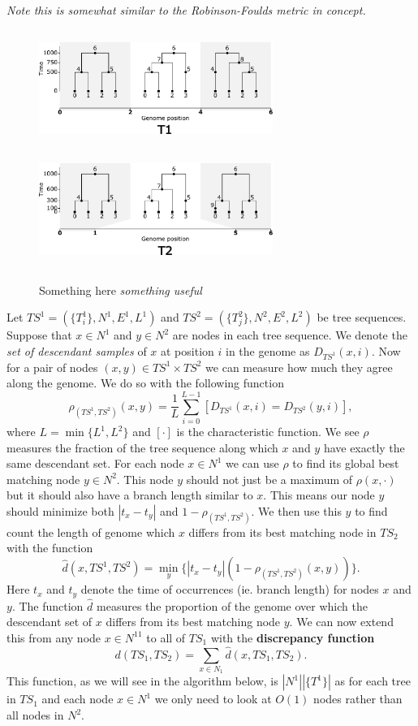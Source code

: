 \documentclass[10pt,twoside,lineno]{gsajnl}
\newcommand{\comment}[1]{{\color{blue} \it #1}}
\begin{document}
\comment{Note this is somewhat similar to the Robinson-Foulds metric in concept.}
 

\begin{figure}[!ht]
	\begin{center}
\includegraphics[height=1.5in, width=3in]{discrepancy_func_method_t1.pdf}
\includegraphics[height=1.5in, width=3in]{discrepancy_function_method_t2.pdf}
    \caption{
        Something here \comment{something useful}
        \label{fig:conceptual_discrepancy}
    }
	\end{center}
\end{figure}

 Let $TS^1=(\{T_i^1\},N^1,E^1,L^1)$ and $TS^2=(\{T^2_j\},N^2,E^2,L^2)$ be tree sequences.
 Suppose that $x\in N^1$ and $y\in N^2$ are nodes in each tree sequence.
 We denote the \textit{set of descendant samples} of $x$ at position $i$ in the genome as $D_{TS^1}(x,i)$.
 Now for a pair of nodes $(x,y)\in TS^1\times TS^2$ 
 we can measure how much they agree along the genome.
 We do so with the following function
 $$\rho_{(TS^1,TS^2)}(x,y)=\frac{1}{L}\sum_{i=0}^{L-1}[D_{TS^1}(x,i)=D_{TS^2}(y,i)],$$
 where $L=\min\{L^1,L^2\}$ and $[\cdot]$ is the characteristic function. 
 We see $\rho$ measures the fraction of the tree sequence
 along which $x$ and $y$ have exactly the same descendant set. 
 For each node $x\in N^1$ we can use $\rho$ to find its global best matching node $y\in N^2$. 
 This node $y$ should not just be a maximum of $\rho(x,\cdot)$ but it should also have a branch length similar to $x$. 
 This means our node $y$ should minimize both $|t_x-t_y|$ and $1-\rho_{(TS^1,TS^2)}$.
 We then use this $y$ to find count the length of genome which $x$ differs from its best matching node in $TS_2$ with the function
 $$\hat{d}(x,TS^1,TS^2)=\min_y\{|t_x-t_y|(1-\rho_{(TS^1,TS^2)}(x,y))\}.$$
 Here $t_x$ and $t_y$ denote the time of occurrences (ie. branch length) for nodes $x$ and $y$. 
 The function $\hat{d}$ measures the proportion of the genome 
 over which the descendant set of $x$ differs from its best matching node $y$.
 We can now extend this from any node $x\in N^11$ to all of $TS_1$ with the \textbf{discrepancy function}
 $$d(TS_1,TS_2)=\sum_{x\in N_1}\hat{d}(x,TS_1,TS_2).$$
 This function, as we will see in the algorithm below,
 is $|N^1||\{T^1\}|$ as for each tree in $TS_1$ and each node $x\in N^1$ we only need to look at $O(1)$ nodes rather than all nodes in $N^2$.
 
\end{document}
